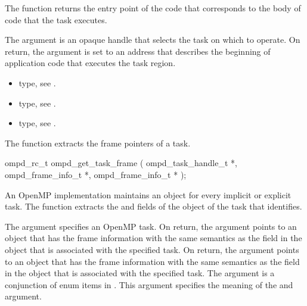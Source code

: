 \descr
The  function returns the entry point of the code
that corresponds to the body of code that the task executes.

\argdesc
The  argument is an opaque handle that selects the task 
on which to operate. On return, the  argument is set to
an address that describes the beginning of application code that executes 
the task region.

\crossreferences
\begin{itemize}
\item {} type, see .

\item {} type, see .

\item {} type, see .
\end{itemize}



\label{subsubsubsec:ompd_get_task_frame}
\summary
The  function extracts the frame pointers of a task.

\format
\begin{cspecific}
\begin{ompSyntax}
ompd_rc_t ompd_get_task_frame (
  ompd_task_handle_t *,
  ompd_frame_info_t *,
  ompd_frame_info_t *
);
\end{ompSyntax}
\end{cspecific}

\descr
An OpenMP implementation  maintains an  object for every 
implicit or explicit task. The  function extracts 
the  and  fields of the  
object of the task that  identifies.

\argdesc
The  argument specifies an OpenMP task. On return, the 
 argument points to an  object  
that has the frame information with the same semantics as the  
field in the  object that is associated with the specified 
task. On return, the  argument points to an 
 object that has the frame information with the same 
semantics as the  field in the  object 
that is associated with the specified task. The  argument 
is a conjunction of enum items in . This argument 
specifies the meaning of the  and  argument.

